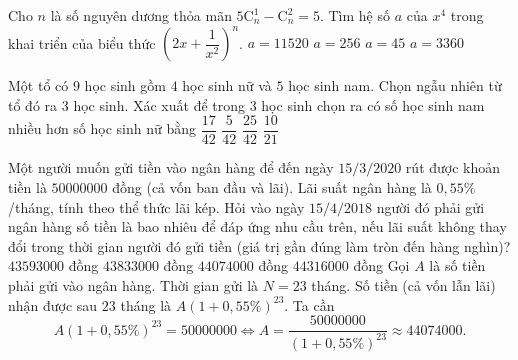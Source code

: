 \begin{ex}%
	Cho $n$ là số nguyên dương thỏa mãn $5\mathrm{C}^1_n-\mathrm{C}^2_n=5$. Tìm hệ số $a$ của $x^4$ trong khai triển của biểu thức $\left(2x+\dfrac{1}{x^2}\right)^n$.
	\choice
	{\True $a=11520$}
	{$a=256$}
	{$a=45$}
	{$a=3360$}
\end{ex}

\begin{ex}%
	Một tổ có $9$ học sinh gồm $4$ học sinh nữ và $5$ học sinh nam. Chọn ngẫu nhiên từ tổ đó ra $3$ học sinh. Xác xuất để trong $3$ học sinh chọn ra có số học sinh nam nhiều hơn số học sinh nữ bằng
	\choice
	{$\dfrac{17}{42}$}
	{$\dfrac{5}{42}$}
	{\True $\dfrac{25}{42}$}
	{$\dfrac{10}{21}$}
\end{ex}

\begin{ex}%
	Một người muốn gửi tiền vào ngân hàng để đến ngày $15/3/2020$ rút được khoản tiền là $50000000$ đồng (cả vốn ban đầu và lãi). Lãi suất ngân hàng là $0{,}55\%$/tháng, tính theo thể thức lãi kép. Hỏi vào ngày $15/4/2018$ người đó phải gửi ngân hàng số tiền là bao nhiêu để đáp ứng nhu cầu trên, nếu lãi suất không thay đổi trong thời gian người đó gửi tiền (giá trị gần đúng làm tròn đến hàng nghìn)?
	\choice
	{$43593000$ đồng}
	{\True $43833000$ đồng}
	{$44074000$ đồng}
	{$44316000$ đồng}
	\loigiai
	{Gọi $A$ là số tiền phải gửi vào ngân hàng. Thời gian gửi là $N=23$ tháng. Số tiền (cả vốn lẫn lãi) nhận được sau $23$ tháng là $A(1+0{,}55\%)^{23}$. Ta cần
		$$A(1+0{,}55\%)^{23}=50000000 \Leftrightarrow A=\dfrac{50000000}{(1+0{,}55\%)^{23}}\approx 44074000.$$
	}
\end{ex}

